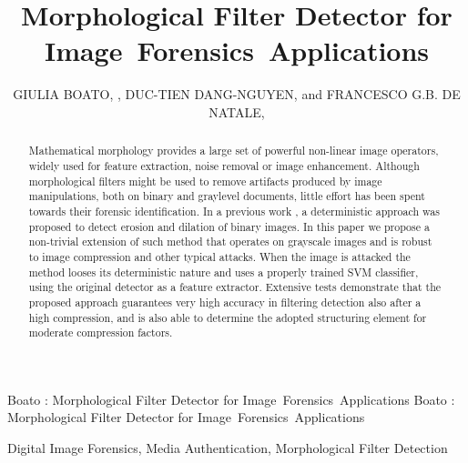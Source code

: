 \documentclass{ieeeaccess}
\begin{document}

\title{Morphological Filter Detector for Image~Forensics~Applications}
\author{\uppercase{Giulia Boato}, ,
\uppercase{Duc-Tien Dang-Nguyen},  and \uppercase{Francesco G.B. De Natale},}
\address[1]{University of Trento, Italy (e-mail: giulia.boato@unitn.it; francesco.denatale@unitn.it)}
\address[2]{University of Bergen, Norway(e-mail: ductien.dangnguyen@uib.no)}

\markboth
{Boato \headeretal: Morphological Filter Detector for Image~Forensics~Applications}
{Boato \headeretal: Morphological Filter Detector for Image~Forensics~Applications}


\begin{abstract}
Mathematical morphology provides a large set of powerful non-linear image operators, widely used for feature extraction, noise removal or image enhancement. Although morphological filters might be used to remove artifacts produced by image manipulations, both on binary and graylevel documents, little effort has been spent towards their forensic identification. In a previous work \cite{de2017detecting}, a deterministic approach was proposed to detect erosion and dilation of binary images. In this paper we propose a non-trivial extension of such method that operates on grayscale images and is robust to image compression and other typical attacks. When the image is attacked the method looses its deterministic nature and uses a properly trained SVM classifier, using the original detector as a feature extractor. Extensive tests demonstrate that the proposed approach guarantees very high accuracy in filtering detection also after a high compression, and is also able to determine the adopted structuring element for moderate compression factors.
\end{abstract}

\begin{keywords}
Digital Image Forensics, Media Authentication, Morphological Filter Detection
%
\end{keywords}
\end{document}
